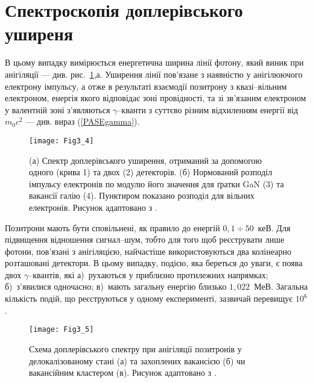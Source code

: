 \section{Спектроскопія доплерівського уширеня}\label{secPAS_SDU}

В цьому випадку вимірюється енергетична ширина лінії фотону,
який виник при анігіляції --- див. рис.~\ref{F34},а.
Уширення лінії пов'язане з наявністю у анігілюючого електрону імпульсу,
а отже в результаті взаємодії позитрону з квазі--вільним електроном, енергія якого відповідає
зоні провідності, та зі зв'язаним електроном у валентній зоні
з'являються $\gamma$--кванти з суттєво різним відхиленням енергії від $m_0c^2$
--- див. вираз (\ref{PASEgamma}).

\begin{figure}[!t]
\center
\vspace{-5mm}
\texttt{[image: Fig3\_4]}
\vspace{-3mm}
\caption{(а) Спектр доплерівського уширення,
отриманий за допомогою одного (крива 1) та двох (2)
детекторів.
(б) Нормований розподіл імпульсу електронів
по модулю його значення для ґратки GaN (3)
та вакансії галію (4).
Пунктиром показано розподіл для вільних електронів.
Рисунок адаптовано з \cite{PAS}.
}
\vspace{-3mm}
\label{F34}
\end{figure}

Позитрони мають бути сповільнені, як правило до енергій $0,1\div50$~кеВ.
Для підвищення відношення сигнал--шум, тобто для того щоб реєструвати лише фотони, пов'язані з анігіляцією,
найчастіше використовуються два колінеарно розташовані детектори.
В цьому випадку, подією, яка береться до уваги, є поява двох $\gamma$--квантів, які
а)~рухаються у приблизно протилежних напрямках;
б)~з'явилися одночасно;
в)~мають загальну енергію близько $1,022$~МеВ.
Загальна кількість подій, що реєструються у одному експерименті,
зазвичай перевищує $10^6$.

\begin{figure}[!b]
\center
\vspace{-5mm}
\texttt{[image: Fig3\_5]}
\vspace{-3mm}
\caption{Схема доплерівського спектру при анігіляції
позитронів у делокалізованому стані (а) та захоплених вакансією (б) чи вакансійним кластером (в).
Рисунок адаптовано з \cite{Uedono_2014}.
}
\vspace{-3mm}
\label{F35}
\end{figure}

